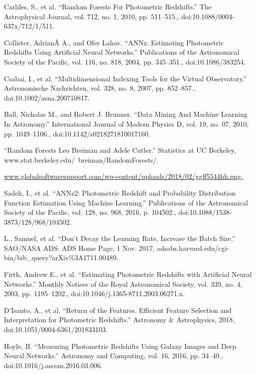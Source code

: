 \documentclass[12pt,letterpaper,oneside,openright]{book}
\begin{document}
\begin{thebibliography}{99\kern\bibindent}
Carliles, S., et al. “Random Forests For Photometric Redshifts.” The Astrophysical Journal, vol. 712, no. 1, 2010, pp. 511–515., doi:10.1088/0004-637x/712/1/511.

Collister, AdrianÂ A., and Ofer Lahav. “ANNz: Estimating Photometric Redshifts Using Artificial Neural Networks.” Publications of the Astronomical Society of the Pacific, vol. 116, no. 818, 2004, pp. 345–351., doi:10.1086/383254.

Csabai, I., et al. “Multidimensional Indexing Tools for the Virtual Observatory.” Astronomische Nachrichten, vol. 328, no. 8, 2007, pp. 852–857., doi:10.1002/asna.200710817.


Ball, Nicholas M., and Robert J. Brunner. “Data Mining And Machine Learning In Astronomy.” International Journal of Modern Physics D, vol. 19, no. 07, 2010, pp. 1049–1106., doi:10.1142/s0218271810017160.

“Random Forests Leo Breiman and Adele Cutler.” Statistics at UC Berkeley, www.stat.berkeley.edu/~breiman/RandomForests/.

\url{www.globalsoftwaresupport.com/wp-content/uploads/2018/02/ggff5544hh.png.}

Sadeh, I., et al. “ANNz2: Photometric Redshift and Probability Distribution Function Estimation Using Machine Learning.” Publications of the Astronomical Society of the Pacific, vol. 128, no. 968, 2016, p. 104502., doi:10.1088/1538-3873/128/968/104502.

L., Samuel, et al. “Don't Decay the Learning Rate, Increase the Batch Size.” SAO/NASA ADS: ADS Home Page, 1 Nov. 2017, adsabs.harvard.edu/cgi-bin/bib\_{}query?arXiv\%{}3A1711.00489.

Firth, Andrew E., et al. “Estimating Photometric Redshifts with Artificial Neural Networks.” Monthly Notices of the Royal Astronomical Society, vol. 339, no. 4, 2003, pp. 1195–1202., doi:10.1046/j.1365-8711.2003.06271.x.

D'Isanto, A., et al. “Return of the Features. Efficient Feature Selection and Interpretation for Photometric Redshifts.” Astronomy \&{} Astrophysics, 2018, doi:10.1051/0004-6361/201833103.

Hoyle, B. “Measuring Photometric Redshifts Using Galaxy Images and Deep Neural Networks.” Astronomy and Computing, vol. 16, 2016, pp. 34–40., doi:10.1016/j.ascom.2016.03.006.


\end{thebibliography}
\end{document}
